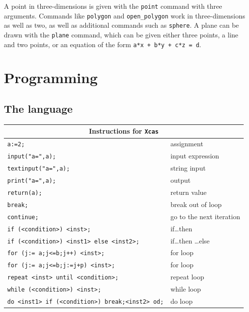 \documentclass{article}
\begin{document}
A point in three-dimensions is given with the \texttt{point} command
with three arguments.  Commands like \texttt{polygon} and
\texttt{open\_polygon} work in three-dimensions as well as two, as
well as additional commands such as \texttt{sphere}.  A plane can be
drawn with the \texttt{plane} command, which can be given either three
points, a line and two points, or an equation of the form \texttt{a*x
+ b*y + c*z = d}.


\section{Programming}

\subsection{The language}

\begin{center}
\begin{tabular}{|p{}|p{}|}
\hline
\multicolumn{2}{|c|}{\textbf{Instructions for \texttt{Xcas}}}\\
\hline\hline
\texttt{a:=2;} & assignment \\
\texttt{input("a=",a);} & input expression \\
\texttt{textinput("a=",a);} & string input \\
\texttt{print("a=",a);} & output\\
\texttt{return(a);} & return value\\
\texttt{break;} & break out of loop\\
\texttt{continue;} & go to the next iteration\\
\texttt{if (<condition>) {<inst>};}  & if\dots then\\
\texttt{if (<condition>) {<inst1>} else {<inst2>};}  &
	     if\dots then \dots else\\
\texttt{for (j:= a;j<=b;j++) {<inst>};} & for loop\\
\texttt{for (j:= a;j<=b;j:=j+p) {<inst>};} & for loop\\
\texttt{repeat <inst> until <condition>;} & repeat loop\\
\texttt{while (<condition>) {<inst>};} & while loop\\
\texttt{do <inst1> if (<condition>) break;<inst2> od;} & do loop\\
\hline
\end{tabular}
\end{center}
\end{document}
